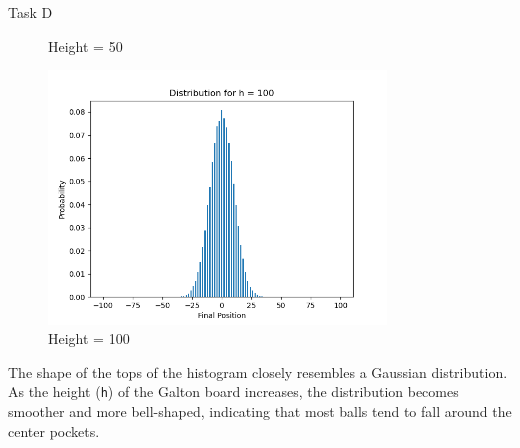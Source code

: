 \begin{task}{Task D}
\begin{figure}[H]
\begin{minipage}{0.5\textwidth}
			\caption{Height = 50}
		\end{minipage}\hfill
	\end{figure}
	\begin{figure}[H]
		\centering
		\includegraphics[width=0.8\textwidth]{../images/2d3.png}
		\caption{Height = 100}
	\end{figure}

	The shape of the tops of the histogram closely resembles a Gaussian
	distribution. As the height (\texttt{h}) of the Galton board increases,
	the distribution becomes smoother and more bell-shaped, indicating that
	most balls tend to fall around the center pockets.
\end{task}

